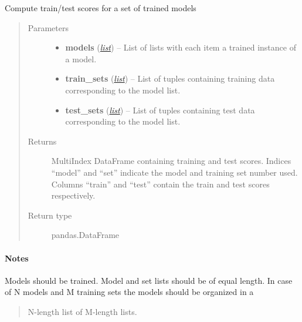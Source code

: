 \documentclass[letterpaper,10pt,english]{sphinxmanual}
\begin{document}
\begin{fulllineitems}
\label{flamingo/classification/index:flamingo.classification.models.score_models}
Compute train/test scores for a set of trained models
\begin{quote}\begin{description}
\item[{Parameters}] \leavevmode\begin{itemize}
\item {} 
\textbf{models} (\href{http://docs.python.org/library/functions.html\#list}{\emph{list}}) -- List of lists with each item a trained instance of a model.

\item {} 
\textbf{train\_sets} (\href{http://docs.python.org/library/functions.html\#list}{\emph{list}}) -- List of tuples containing training data corresponding to the model list.

\item {} 
\textbf{test\_sets} (\href{http://docs.python.org/library/functions.html\#list}{\emph{list}}) -- List of tuples containing test data corresponding to the model list.

\end{itemize}

\item[{Returns}] \leavevmode
MultiIndex DataFrame containing training and test scores.
Indices ``model'' and ``set'' indicate the model and training set number used.
Columns ``train'' and ``test'' contain the train and test scores respectively.

\item[{Return type}] \leavevmode
pandas.DataFrame

\end{description}\end{quote}
\paragraph{Notes}

Models should be trained.
Model and set lists should be of equal length.
In case of N models and M training sets the models should be organized in a
\begin{quote}

N-length list of M-length lists.
\end{quote}


\end{fulllineitems}
\end{document}

